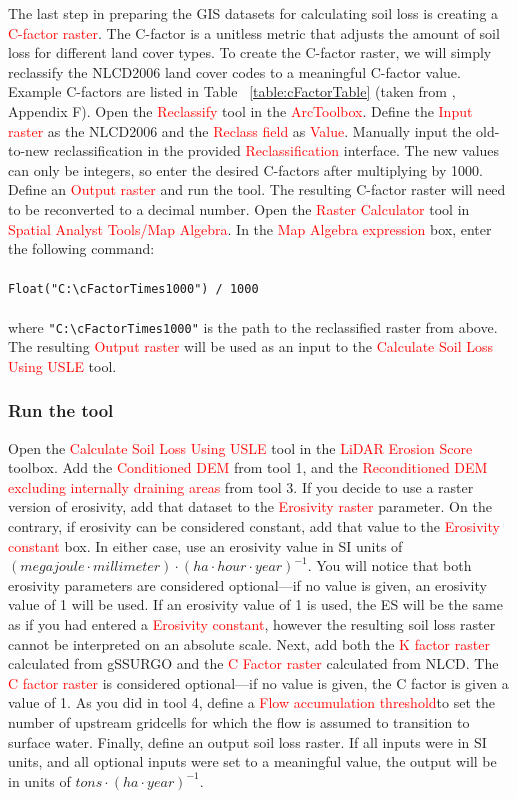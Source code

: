 \documentclass{article}
\newcommand{\toolPar}[1]{\textcolor{red}{#1}}
\begin{document}
			The last step in preparing the GIS datasets for calculating soil loss is creating a \toolPar{C-factor raster}. The C-factor is a unitless metric that adjusts the amount of soil loss for different land cover types. To create the C-factor raster, we will simply reclassify the NLCD2006 land cover codes to a meaningful C-factor value. Example C-factors are listed in Table ~\ref{table:cFactorTable} (taken from \cite{montana_deq_draft_2012}, Appendix F). Open the \toolPar{Reclassify} tool in the \toolPar{ArcToolbox}. Define the \toolPar{Input raster} as the NLCD2006 and the \toolPar{Reclass field} as \toolPar{Value}. Manually input the old-to-new reclassification in the provided \toolPar{Reclassification} interface. The new values can only be integers, so enter the desired C-factors after multiplying by 1000. Define an \toolPar{Output raster} and run the tool. The resulting C-factor raster will need to be reconverted to a decimal number. Open the \toolPar{Raster Calculator} tool in \toolPar{Spatial Analyst Tools/Map Algebra}. In the \toolPar{Map Algebra expression} box, enter the following command:\\\\\texttt{Float("C:\textbackslash{}cFactorTimes1000") / 1000}\\\\where \texttt{"C:\textbackslash{}cFactorTimes1000"} is the path to the reclassified raster from above. The resulting \toolPar{Output raster} will be used as an input to the \toolPar{Calculate Soil Loss Using USLE} tool.
		\subsubsection{Run the tool}
			Open the \toolPar{Calculate Soil Loss Using USLE} tool in the \toolPar{LiDAR Erosion Score} toolbox. Add the \toolPar{Conditioned DEM} from tool 1, and the \toolPar{Reconditioned DEM excluding internally draining areas} from tool 3. If you decide to use a raster version of erosivity, add that dataset to the \toolPar{Erosivity raster} parameter. On the contrary, if erosivity can be considered constant, add that value to the \toolPar{Erosivity constant} box. In either case, use an erosivity value in SI units of $(megajoule \cdot millimeter) \cdot (ha \cdot hour \cdot year)^{-1}$. You will notice that both erosivity parameters are considered optional---if no value is given, an erosivity value of 1 will be used. If an erosivity value of 1 is used, the ES will be the same as if you had entered a \toolPar{Erosivity constant}, however the resulting soil loss raster cannot be interpreted on an absolute scale. Next, add both the \toolPar{K factor raster} calculated from gSSURGO and the \toolPar{C Factor raster} calculated from NLCD. The \toolPar{C factor raster} is considered optional---if no value is given, the C factor is given a value of 1. As you did in tool 4, define a \toolPar{Flow accumulation threshold}\footnotemark[10] to set the number of upstream gridcells for which the flow is assumed to transition to surface water. Finally, define an output soil loss raster. If all inputs were in SI units, and all optional inputs were set to a meaningful value, the output will be in units of $tons \cdot (ha \cdot year)^{-1}$.
\end{document}
